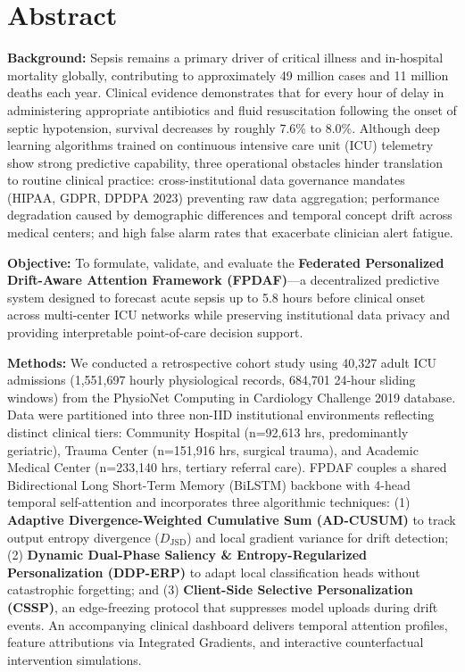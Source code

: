 \documentclass[11pt,a4paper]{article}
\begin{document}
\section*{Abstract}
\textbf{Background:} Sepsis remains a primary driver of critical illness and in-hospital mortality globally, contributing to approximately 49 million cases and 11 million deaths each year. Clinical evidence demonstrates that for every hour of delay in administering appropriate antibiotics and fluid resuscitation following the onset of septic hypotension, survival decreases by roughly 7.6\% to 8.0\%. Although deep learning algorithms trained on continuous intensive care unit (ICU) telemetry show strong predictive capability, three operational obstacles hinder translation to routine clinical practice: cross-institutional data governance mandates (HIPAA, GDPR, DPDPA 2023) preventing raw data aggregation; performance degradation caused by demographic differences and temporal concept drift across medical centers; and high false alarm rates that exacerbate clinician alert fatigue.

\textbf{Objective:} To formulate, validate, and evaluate the \textbf{Federated Personalized Drift-Aware Attention Framework (FPDAF)}---a decentralized predictive system designed to forecast acute sepsis up to 5.8 hours before clinical onset across multi-center ICU networks while preserving institutional data privacy and providing interpretable point-of-care decision support.

\textbf{Methods:} We conducted a retrospective cohort study using 40,327 adult ICU admissions (1,551,697 hourly physiological records, 684,701 24-hour sliding windows) from the PhysioNet Computing in Cardiology Challenge 2019 database. Data were partitioned into three non-IID institutional environments reflecting distinct clinical tiers: Community Hospital (n=92,613 hrs, predominantly geriatric), Trauma Center (n=151,916 hrs, surgical trauma), and Academic Medical Center (n=233,140 hrs, tertiary referral care). FPDAF couples a shared Bidirectional Long Short-Term Memory (BiLSTM) backbone with 4-head temporal self-attention and incorporates three algorithmic techniques: (1) \textbf{Adaptive Divergence-Weighted Cumulative Sum (AD-CUSUM)} to track output entropy divergence ($D_{\text{JSD}}$) and local gradient variance for drift detection; (2) \textbf{Dynamic Dual-Phase Saliency \& Entropy-Regularized Personalization (DDP-ERP)} to adapt local classification heads without catastrophic forgetting; and (3) \textbf{Client-Side Selective Personalization (CSSP)}, an edge-freezing protocol that suppresses model uploads during drift events. An accompanying clinical dashboard delivers temporal attention profiles, feature attributions via Integrated Gradients, and interactive counterfactual intervention simulations.
\end{document}
